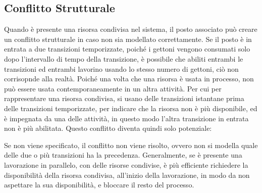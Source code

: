 \documentclass{article}
\numberwithin{equation}{subsection}
\begin{document}
\subsection{Conflitto Strutturale}

Quando è presente una risorsa condivisa nel sistema, il posto associato può creare un conflitto strutturale in caso non sia modellato correttamente. Se il posto è in entrata 
a due transizioni temporizzate, poiché i gettoni vengono consumati solo dopo l'intervallo di tempo della transizione, è possibile che abiliti entrambi le transizioni ed 
entrambi lavorino usando lo stesso numero di gettoni, ciò non corrisopnde alla realtà. Poiché una volta che una risorsa è usata in processo, non può essere usata contemporaneamente 
in un altra attività. Per cui per rappresentare una risorsa condivisa, si usano delle transizioni istantane prima delle transizioni temporizzate, per indicare che la 
risorsa non è più disponibile, ed è impegnata da una delle attività, in questo modo l'altra transizione in entrata non è più abilitata. Questo conflitto diventa quindi solo 
potenziale: 
\begin{center}
\end{center}

Se non viene specificato, il conflitto non viene risolto, ovvero non si modella quale delle due o più transizioni ha la precedenza. Generalmente, se è presente una 
lavorazione in parallelo, con delle risorse condivise, è più efficiente richiedere la disponibilità della risorsa condivisa, all'inizio della lavorazione, in modo da 
non aspettare la sua disponibilità, e bloccare il resto del processo. 
\end{document}
